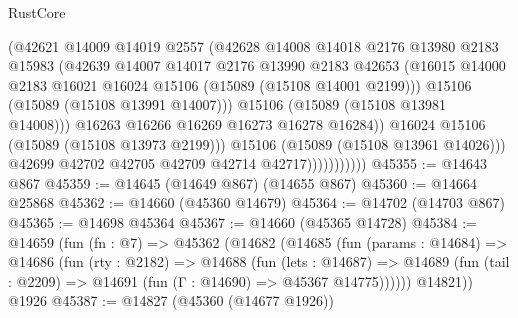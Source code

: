 \begin{lexlean}{RustCore}
\begin{coremodule}
                                (@42621
                                  @14009
                                  @14019
                                  @2557
                                  (@42628
                                    @14008
                                    @14018
                                    @2176
                                    @13980
                                    @2183
                                    @15983
                                    (@42639
                                      @14007
                                      @14017
                                      @2176
                                      @13990
                                      @2183
                                      @42653
                                      (@16015
                                        @14000
                                        @2183
                                        @16021
                                        @16024
                                        @15106
                                        (@15089 (@15108 @14001 @2199)))
                                      @15106
                                      (@15089 (@15108 @13991 @14007)))
                                    @15106
                                    (@15089 (@15108 @13981 @14008)))
                                  @16263
                                  @16266
                                  @16269
                                  @16273
                                  @16278
                                  @16284))
                              @16024
                              @15106
                              (@15089 (@15108 @13973 @2199)))
                            @15106
                            (@15089 (@15108 @13961 @14026)))
                          @42699
                          @42702
                          @42705
                          @42709
                          @42714
                          @42717)))))))))))
@45355 := @14643 @867
@45359 := @14645 (@14649 @867) (@14655 @867)
@45360 := @14664 @25868
@45362 := @14660 (@45360 @14679)
@45364 := @14702 (@14703 @867)
@45365 := @14698 @45364
@45367 := @14660 (@45365 @14728)
@45384 := @14659
    (fun (fn : @7) =>
    @45362
      (@14682
        (@14685
          (fun (params : @14684) =>
          @14686
            (fun (rty : @2182) =>
            @14688
              (fun (lets : @14687) =>
              @14689 (fun (tail : @2209) => @14691 (fun (Γ : @14690) => @45367 @14775))))))
        @14821))
    @1926
@45387 := @14827 (@45360 (@14677 @1926))

\end{coremodule}
\end{lexlean}
